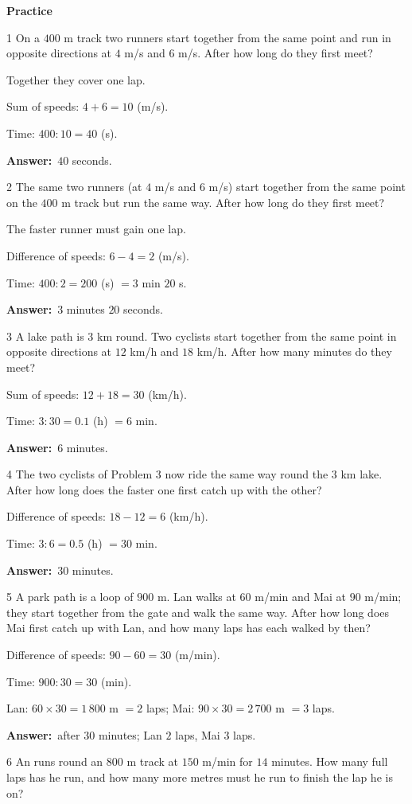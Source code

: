 \documentclass[11pt]{article}
\newif\ifsol \solfalse
\providecommand{\AnsWord}{Đáp số}
\newcommand{\dapso}[1]{\par\textbf{\AnsWord:}\ #1}
\newcommand{\probsol}[1]{%
  \begin{lrbox}{\solmeasure}\begin{minipage}{\dimexpr\linewidth-24pt\relax}#1\end{minipage}\end{lrbox}%
  \ifsol
    \begin{solbox}#1\end{solbox}%
  \else
    \setlength{\solht}{\dimexpr\ht\solmeasure+\dp\solmeasure+0.85cm\relax}%
    \ifdim\solht<1.35cm\setlength{\solht}{1.35cm}\fi
    \begin{tcolorbox}[colback=white,colframe=Line,boxrule=0.8pt,arc=5pt,
      left=8pt,right=8pt,top=4pt,bottom=4pt,height=\solht]{\footnotesize\color{Slate}\itshape\WorkWord}\end{tcolorbox}%
  \fi}
\newcommand{\dividerbar}[1]{\par\vspace{0.6em}\noindent
  \begin{tcolorbox}[enhanced,frame hidden,interior hidden,borderline west={5pt}{0pt}{ProbBlue},
    colback=white,left=12pt,right=12pt,top=5pt,bottom=5pt,arc=4pt]
  {\large\bfseries\color{ProbBlue} #1}\end{tcolorbox}\vspace{0.4em}}
\newcommand{\gap}{\vspace{0.3cm}}
\def\WorkWord{Your work:}
\def\AnsWord{Answer}
\begin{document}
\dividerbar{Practice}
\begin{probbox}{1}{\relax}
On a $400$ m track two runners start together from the same point and run in opposite directions at $4$ m/s and $6$ m/s. After how long do they first meet?
\end{probbox}
\probsol{
Together they cover one lap.\par Sum of speeds: $4+6=10$ (m/s).\par Time: $400:10=40$ (s).
\dapso{$40$ seconds.}}
\gap
\begin{probbox}{2}{\relax}
The same two runners (at $4$ m/s and $6$ m/s) start together from the same point on the $400$ m track but run the same way. After how long do they first meet?
\end{probbox}
\probsol{
The faster runner must gain one lap.\par Difference of speeds: $6-4=2$ (m/s).\par Time: $400:2=200$ (s) $=3$ min $20$ s.
\dapso{$3$ minutes $20$ seconds.}}
\gap
\begin{probbox}{3}{\relax}
A lake path is $3$ km round. Two cyclists start together from the same point in opposite directions at $12$ km/h and $18$ km/h. After how many minutes do they meet?
\end{probbox}
\probsol{
Sum of speeds: $12+18=30$ (km/h).\par Time: $3:30=0.1$ (h) $=6$ min.
\dapso{$6$ minutes.}}
\gap
\begin{probbox}{4}{\relax}
The two cyclists of Problem 3 now ride the same way round the $3$ km lake. After how long does the faster one first catch up with the other?
\end{probbox}
\probsol{
Difference of speeds: $18-12=6$ (km/h).\par Time: $3:6=0.5$ (h) $=30$ min.
\dapso{$30$ minutes.}}
\gap
\begin{probbox}{5}{\relax}
A park path is a loop of $900$ m. Lan walks at $60$ m/min and Mai at $90$ m/min; they start together from the gate and walk the same way. After how long does Mai first catch up with Lan, and how many laps has each walked by then?
\end{probbox}
\probsol{
Difference of speeds: $90-60=30$ (m/min).\par Time: $900:30=30$ (min).\par
Lan: $60\times30=1\,800$ m $=2$ laps; Mai: $90\times30=2\,700$ m $=3$ laps.
\dapso{after $30$ minutes; Lan $2$ laps, Mai $3$ laps.}}
\gap
\begin{probbox}{6}{\relax}
An runs round an $800$ m track at $150$ m/min for $14$ minutes. How many full laps has he run, and how many more metres must he run to finish the lap he is on?
\end{probbox}
\end{document}
